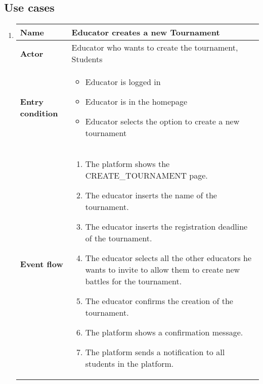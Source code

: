 \subsection{Use cases}
\begin{enumerate}[label=\textbf{UC\arabic*}:,leftmargin=1.3cm]
      \item \textbf{}
      \begin{table}[H]
          \centering
          \begin{tabular}{|l|p{11.9cm}|}
              \hline
              \textbf{Name}            & Educator creates a new Tournament                     \\\hline
              \textbf{Actor}           & Educator who wants to create the tournament, Students                                                                             \\\hline
              \textbf{Entry condition} &
              \begin{itemize}
                  \item Educator is logged in
                  \item Educator is in the homepage
                  \item Educator selects the option to create a new tournament
              \end{itemize}                                                \\\hline
              \textbf{Event flow}      &
              \begin{enumerate}[label=\arabic*.]
                  \item The platform shows the CREATE_TOURNAMENT page.
                  \item The educator inserts the name of the tournament.
                  \item The educator inserts the registration deadline of the tournament.
                  \item The educator selects all the other educators he wants to invite to allow them to create new battles for the tournament.
                  \item The educator confirms the creation of the tournament.
                  \item The platform shows a confirmation message.
                  \item The platform sends a notification to all students in the platform.

\end{enumerate}
\end{tabular}
\end{table}
\end{enumerate}
